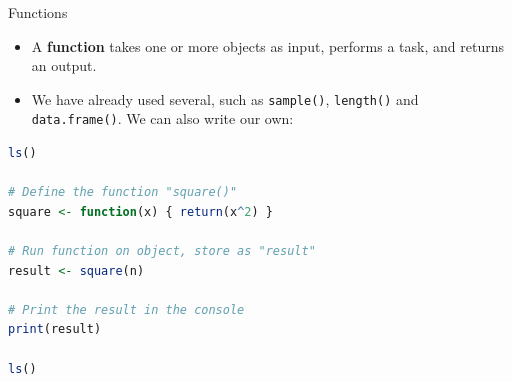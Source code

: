 \documentclass[9pt,aspectratio=169]{beamer}
\begin{document}

\begin{frame}[fragile]{Functions}

\begin{itemize}
  \item A \textbf{function} takes one or more objects as input, performs a task, and returns an output.
  \item We have already used several, such as \texttt{sample()}, \texttt{length()} and \texttt{data.frame()}. We can also write our own:
\end{itemize}

\begin{lstlisting}[language=R, basicstyle=\ttfamily\small]
ls()

# Define the function "square()"
square <- function(x) { return(x^2) }

# Run function on object, store as "result"
result <- square(n)

# Print the result in the console
print(result)

ls()
\end{lstlisting}
\end{frame}
\end{document}
